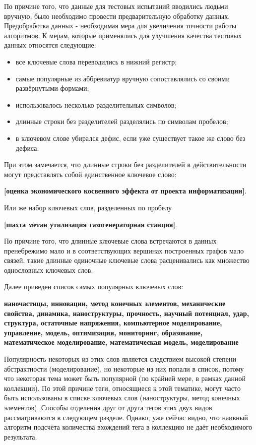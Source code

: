 По причине того, что данные для тестовых испытаний вводились людьми вручную, было необходимо провести предварительную обработку данных. Предобработка данных - необходимая мера для увеличения точности работы алгоритмов. К мерам, которые применялись для улучшения качества тестовых данных относятся следующие:

\begin{itemize}
    \item все ключевые слова переводились в нижний регистр;
    \item самые популярные из аббревиатур вручную сопоставлялись со своими развёрнутыми формами;
    \item использовалось несколько разделительных символов;
    \item длинные строки без разделителей разделялись по символам пробелов;
    \item в ключевом слове убирался дефис, если уже существует такое же слово без дефиса.
\end{itemize}

При этом замечается, что длинные строки без разделителей в действительности могут представлять собой единственное ключевое слово:

\textbf{[оценка экономического косвенного эффекта от проекта информатизации]}.\

Или же набор ключевых слов, разделенных по пробелу

\textbf{[шахта метан утилизация газогенераторная станция]}.\

По причине того, что длинные ключевые слова встречаются в данных пренебрежимо мало и в соответствующих вершинах построенных графов мало связей, такие длинные одиночные ключевые слова расценивались как множество однословных ключевых слов.

Далее приведен список самых популярных ключевых слов:

\textbf{наночастицы, инновации, метод конечных элементов, механические свойства, динамика, наноструктуры, прочность, научный потенциал, удар, структура, остаточные напряжения, компьютерное моделирование, управление, модель, оптимизация, мониторинг, образование, математическое моделирование, математическая модель, моделирование}

Популярность некоторых из этих слов является следствием высокой степени абстрактности (моделирование), но некоторые из них попали в список, потому что некоторая тема может быть популярной (по крайней мере, в рамках данной коллекции). По этой причине теги, относящиеся к этой тематике, могут часто быть использованы в списке ключевых слов (наноструктуры, метод конечных элементов). Способы отделения друг от друга тегов этих двух видов рассматриваются в следующем разделе. Однако, уже сейчас видно, что наивный алгоритм подсчёта количества вхождений тега в коллекцию не даёт необходимого результата.

